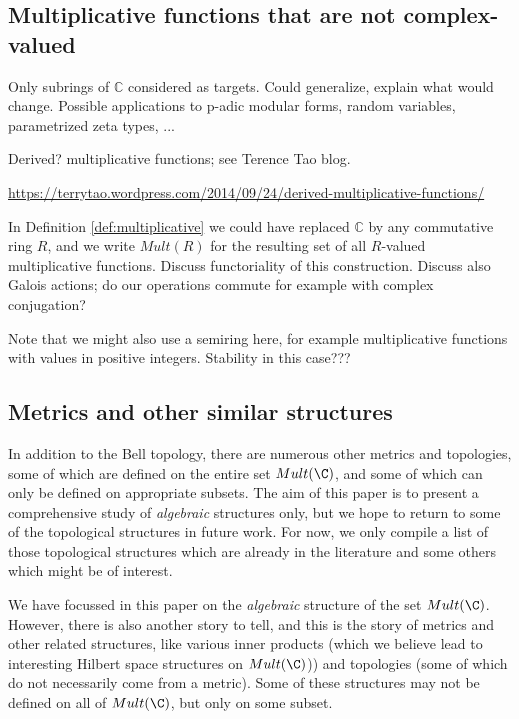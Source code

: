 \subsection{Multiplicative functions that are not complex-valued}

Only subrings of $\mathbb{C}$ considered as targets. Could generalize, explain what would change. Possible applications to p-adic modular forms, random variables, parametrized zeta types, ...


Derived? multiplicative functions; see Terence Tao blog.

\url{https://terrytao.wordpress.com/2014/09/24/derived-multiplicative-functions/}



In Definition \ref{def:multiplicative} we could have replaced $\mathbb{C}$ by any commutative ring $R$, and we write $Mult(R)$ for the resulting set of all $R$-valued multiplicative functions. Discuss functoriality of this construction. Discuss also Galois actions; do our operations commute for example with complex conjugation? 

Note that we might also use a semiring here, for example multiplicative functions with values in positive integers. Stability in this case???











\subsection{Metrics and other similar structures}

In addition to the Bell topology, there are numerous other metrics and topologies, some of which are defined on the entire set $Mult(\C)$, and some of which can only be defined on appropriate subsets. The aim of this paper is to present a comprehensive study of \emph{algebraic} structures only, but we hope to return to some of the topological structures in future work. For now, we only compile a list of those topological structures which are already in the literature and some others which might be of interest.



We have focussed in this paper on the \emph{algebraic} structure of the set $Mult(\C)$. However, there is also another story to tell, and this is the story of metrics and other related structures, like various inner products (which we believe lead to interesting Hilbert space structures on $Mult(\C)$)) and topologies (some of which do not necessarily come from a metric). Some of these structures may not be defined on all of $Mult(\C)$, but only on some subset.

